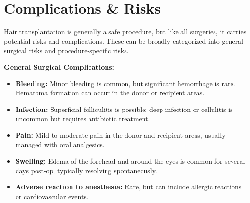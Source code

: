 \section*{Complications \& Risks}
Hair transplantation is generally a safe procedure, but like all surgeries, it carries potential risks and complications. These can be broadly categorized into general surgical risks and procedure-specific risks.

\textbf{General Surgical Complications:}
\begin{itemize}
  \item \textbf{Bleeding:} Minor bleeding is common, but significant hemorrhage is rare. Hematoma formation can occur in the donor or recipient areas.
  \item \textbf{Infection:} Superficial folliculitis is possible; deep infection or cellulitis is uncommon but requires antibiotic treatment.
  \item \textbf{Pain:} Mild to moderate pain in the donor and recipient areas, usually managed with oral analgesics.
  \item \textbf{Swelling:} Edema of the forehead and around the eyes is common for several days post-op, typically resolving spontaneously.
  \item \textbf{Adverse reaction to anesthesia:} Rare, but can include allergic reactions or cardiovascular events.
\end{itemize}

